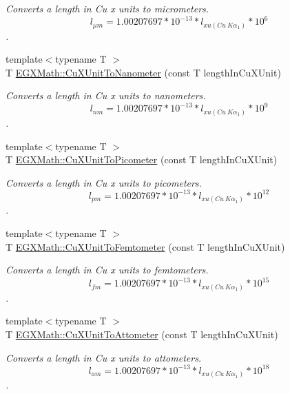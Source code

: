 \begin{DoxyCompactItemize}
\begin{DoxyCompactList}\small\item\em Converts a length in Cu x units to micrometers. \[ l_{\mu m}=1.00207697*10^{-13} * l_{xu(Cu\ K\alpha_1)} * 10^{6} \]. \end{DoxyCompactList}\item 
{\footnotesize template$<$typename T $>$ }\\T \mbox{\hyperlink{group___e_g_x_math-_conversions-_length_conversions-_non-_s_i-_cu_x_unit-_s_i_gac14b0200f069cb1ec0ba03540d93230a}{E\+G\+X\+Math\+::\+Cu\+X\+Unit\+To\+Nanometer}} (const T length\+In\+Cu\+X\+Unit)
\begin{DoxyCompactList}\small\item\em Converts a length in Cu x units to nanometers. \[ l_{nm}=1.00207697*10^{-13} * l_{xu(Cu\ K\alpha_1)} * 10^{9} \]. \end{DoxyCompactList}\item 
{\footnotesize template$<$typename T $>$ }\\T \mbox{\hyperlink{group___e_g_x_math-_conversions-_length_conversions-_non-_s_i-_cu_x_unit-_s_i_ga789ff4191ad452d5dc54f4bd3d267566}{E\+G\+X\+Math\+::\+Cu\+X\+Unit\+To\+Picometer}} (const T length\+In\+Cu\+X\+Unit)
\begin{DoxyCompactList}\small\item\em Converts a length in Cu x units to picometers. \[ l_{pm}=1.00207697*10^{-13} * l_{xu(Cu\ K\alpha_1)} * 10^{12} \]. \end{DoxyCompactList}\item 
{\footnotesize template$<$typename T $>$ }\\T \mbox{\hyperlink{group___e_g_x_math-_conversions-_length_conversions-_non-_s_i-_cu_x_unit-_s_i_ga421b3a85685a8e55cc82e2b268388fca}{E\+G\+X\+Math\+::\+Cu\+X\+Unit\+To\+Femtometer}} (const T length\+In\+Cu\+X\+Unit)
\begin{DoxyCompactList}\small\item\em Converts a length in Cu x units to femtometers. \[ l_{fm}=1.00207697*10^{-13} * l_{xu(Cu\ K\alpha_1)} * 10^{15} \]. \end{DoxyCompactList}\item 
{\footnotesize template$<$typename T $>$ }\\T \mbox{\hyperlink{group___e_g_x_math-_conversions-_length_conversions-_non-_s_i-_cu_x_unit-_s_i_gac5f865a6c60f1712b7f7cfb29d52407b}{E\+G\+X\+Math\+::\+Cu\+X\+Unit\+To\+Attometer}} (const T length\+In\+Cu\+X\+Unit)
\begin{DoxyCompactList}\small\item\em Converts a length in Cu x units to attometers. \[ l_{am}=1.00207697*10^{-13} * l_{xu(Cu\ K\alpha_1)} * 10^{18} \]. \end{DoxyCompactList}\item 

\end{DoxyCompactItemize}
